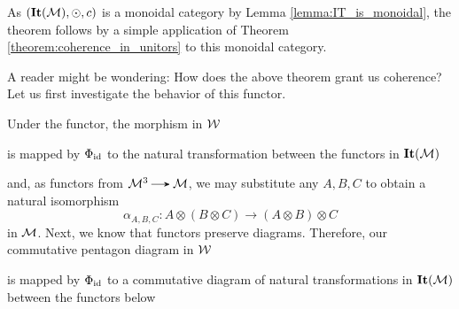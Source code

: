 \begin{prf}
    As $(\textbf{It}(\mathcal{M}), \odot, c)$ is a monoidal category by Lemma 
    \ref{lemma:IT_is_monoidal}, the theorem follows by a simple
    application of Theorem \ref{theorem:coherence_in_unitors} to this 
    monoidal category.
\end{prf}

A reader might be wondering: How does the above theorem grant us coherence? 
Let us first investigate the behavior of this functor. 

Under the functor, the morphism in $\mathcal{W}$ 
\begin{center}
\end{center}
is mapped by $\Phi_{\operatorname{\mathrm{id}}}$ to the natural transformation between the functors in $\textbf{It}(\mathcal{M})$
\begin{center}
\end{center}
and, as functors from $\mm^3 \to \mm$, 
we may substitute any $A,B,C$ to obtain a natural isomorphism 
\[
    \alpha_{A,B,C}: A \otimes (B \otimes C) \to (A \otimes B)\otimes C
\]
in $\mathcal{M}$.
Next, we know that functors preserve diagrams. Therefore, our commutative 
pentagon diagram in $\mathcal{W}$
\begin{center}
\end{center}
is mapped by $\Phi_{\operatorname{\mathrm{id}}}$ to a commutative 
diagram of natural transformations in $\textbf{It}(\mathcal{M})$ 
between the functors below

